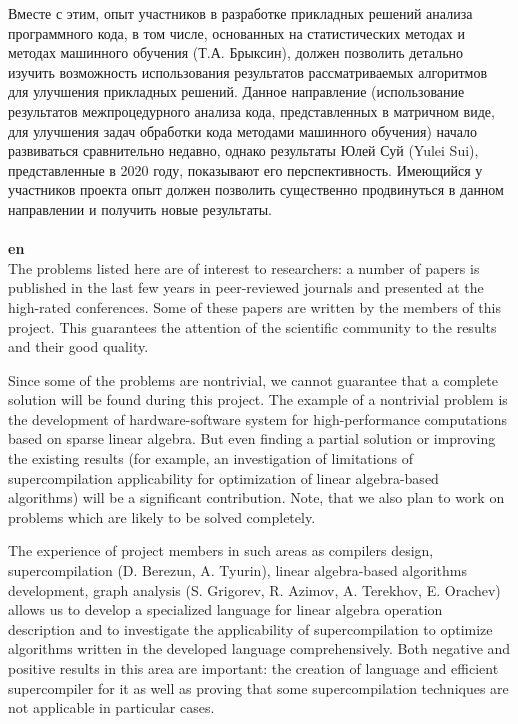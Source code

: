 \documentclass[12pt]{article}  %
\theoremstyle{remark}
\begin{document}
Вместе с этим, опыт участников в разработке прикладных решений анализа программного кода, в том числе, основанных на статистических методах и методах машинного обучения (Т.А. Брыксин), должен позволить детально изучить возможность использования результатов рассматриваемых алгоритмов для улучшения прикладных решений. Данное направление (использование результатов межпроцедурного анализа кода, представленных в матричном виде, для улучшения задач обработки кода методами машинного обучения) начало развиваться сравнительно недавно, однако результаты Юлей Суй (Yulei Sui), представленные в 2020 году, показывают его перспективность. Имеющийся у участников проекта опыт должен позволить существенно продвинуться в данном направлении и получить новые результаты.
\\
\\
\textbf{en}\\

The problems listed here are of interest to researchers: a number of papers is published in the last few years in peer-reviewed journals and presented at the high-rated conferences. Some of these papers are written by the members of this project. This guarantees the attention of the scientific community to the results and their good quality.

Since some of the problems are nontrivial, we cannot guarantee that a complete solution will be found during this project. The example of a nontrivial problem is the development of hardware-software system for high-performance computations based on sparse linear algebra. But even finding a partial solution or improving the existing results (for example, an investigation of limitations of supercompilation applicability for optimization of linear algebra-based algorithms)
will be a significant contribution. Note, that we also plan to work on problems which are likely to be solved completely.

The experience of project members in such areas as compilers design, supercompilation (D. Berezun, A. Tyurin), linear algebra-based algorithms development, graph analysis (S. Grigorev, R. Azimov, A. Terekhov, E. Orachev) allows us to develop a specialized language for linear algebra operation description and to investigate the applicability of supercompilation to optimize algorithms written in the developed language comprehensively. Both negative and positive results in this area are important: the creation of language and efficient supercompiler for it as well as proving that some supercompilation techniques are not applicable in particular cases.
\end{document}
